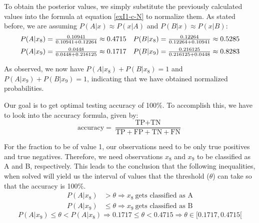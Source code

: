 \documentclass[12pt]{article}
\begin{document}
\begin{enumerate}[leftmargin=\labelsep]
\begin{enumerate}
                To obtain the posterior values, we simply substitute the previously calculated values into the formula at equation \eqref{exI1-c-N} to normalize them.
                As stated before, we are assuming $P(A | x) \approx P(x | A)$ and $P(B | x) \approx P(x | B)$:
                $$
                  \begin{array}{cc}
                    P(A | x_8) = \frac{0.10941}{0.10941 + 0.12264} \approx 0.4715 &
                    P(B | x_8) = \frac{0.12264}{0.12264 + 0.10941} \approx 0.5285   \\[\medskipamount]
                    P(A | x_9) = \frac{0.0448}{0.0448 + 0.216125} \approx 0.1717  &
                    P(B | x_9) = \frac{0.216125}{0.216125 + 0.0448} \approx 0.8283
                  \end{array}
                $$

                As observed, we now have $P(A | x_8) + P(B | x_8) = 1$ and $P(A | x_9) + P(B | x_9) = 1$, indicating that we have obtained normalized probabilities.

                Our goal is to get optimal testing accuracy of 100\%. To accomplish this, we have to look into the accuracy formula, given by:
                $$
                  \text{accuracy} = \frac{\text{TP} + \text{TN}}{\text{TP} + \text{FP} + \text{TN} + \text{FN}}
                $$

                For the fraction to be of value 1, our observations need to be only true positives and true negatives. Therefore, we need observations $x_8$ and $x_9$ to be classified as A and B, respectively.
                This leads to the conclusion that the following inequalities, when solved will yield us the interval of values that the threshold ($\theta$) can take so that the accuracy is 100\%.
                \[
                  \begin{aligned}
                    P(A | x_8) & > \theta \Rightarrow x_8 \ \text{gets classified as A}    \\
                    P(A | x_9) & \leq \theta \Rightarrow x_9 \ \text{gets classified as B}
                  \end{aligned}
                \]
                \begin{equation}
                  P(A | x_9) \leq \theta < P(A | x_8) \Rightarrow 0.1717 \leq \theta < 0.4715 \Rightarrow \theta \in [0.1717, 0.4715[
                \end{equation}

        \end{enumerate}


\end{enumerate}
\end{document}
